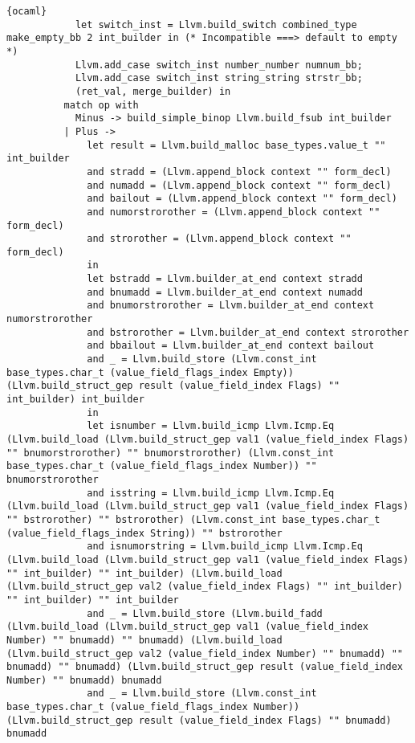 \begin{lstlisting}{ocaml}
            let switch_inst = Llvm.build_switch combined_type make_empty_bb 2 int_builder in (* Incompatible ===> default to empty *)
            Llvm.add_case switch_inst number_number numnum_bb;
            Llvm.add_case switch_inst string_string strstr_bb;
            (ret_val, merge_builder) in
          match op with
            Minus -> build_simple_binop Llvm.build_fsub int_builder
          | Plus ->
              let result = Llvm.build_malloc base_types.value_t "" int_builder
              and stradd = (Llvm.append_block context "" form_decl)
              and numadd = (Llvm.append_block context "" form_decl)
              and bailout = (Llvm.append_block context "" form_decl)
              and numorstrorother = (Llvm.append_block context "" form_decl)
              and strorother = (Llvm.append_block context "" form_decl)
              in
              let bstradd = Llvm.builder_at_end context stradd
              and bnumadd = Llvm.builder_at_end context numadd
              and bnumorstrorother = Llvm.builder_at_end context numorstrorother
              and bstrorother = Llvm.builder_at_end context strorother
              and bbailout = Llvm.builder_at_end context bailout
              and _ = Llvm.build_store (Llvm.const_int base_types.char_t (value_field_flags_index Empty)) (Llvm.build_struct_gep result (value_field_index Flags) "" int_builder) int_builder
              in
              let isnumber = Llvm.build_icmp Llvm.Icmp.Eq (Llvm.build_load (Llvm.build_struct_gep val1 (value_field_index Flags) "" bnumorstrorother) "" bnumorstrorother) (Llvm.const_int base_types.char_t (value_field_flags_index Number)) "" bnumorstrorother
              and isstring = Llvm.build_icmp Llvm.Icmp.Eq (Llvm.build_load (Llvm.build_struct_gep val1 (value_field_index Flags) "" bstrorother) "" bstrorother) (Llvm.const_int base_types.char_t (value_field_flags_index String)) "" bstrorother
              and isnumorstring = Llvm.build_icmp Llvm.Icmp.Eq (Llvm.build_load (Llvm.build_struct_gep val1 (value_field_index Flags) "" int_builder) "" int_builder) (Llvm.build_load (Llvm.build_struct_gep val2 (value_field_index Flags) "" int_builder) "" int_builder) "" int_builder
              and _ = Llvm.build_store (Llvm.build_fadd (Llvm.build_load (Llvm.build_struct_gep val1 (value_field_index Number) "" bnumadd) "" bnumadd) (Llvm.build_load (Llvm.build_struct_gep val2 (value_field_index Number) "" bnumadd) "" bnumadd) "" bnumadd) (Llvm.build_struct_gep result (value_field_index Number) "" bnumadd) bnumadd
              and _ = Llvm.build_store (Llvm.const_int base_types.char_t (value_field_flags_index Number)) (Llvm.build_struct_gep result (value_field_index Flags) "" bnumadd) bnumadd

\end{lstlisting}
